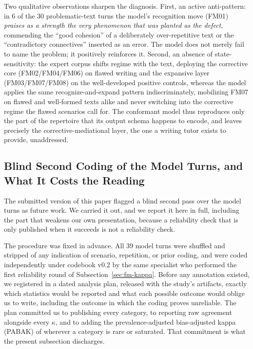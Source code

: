 \documentclass{sbc2023}%
\begin{document}
Two qualitative observations sharpen the diagnosis. First, an active anti-pattern: in 6 of the 30 problematic-text turns the model's recognition move (FM01) \textit{praises as a strength the very phenomenon that was planted as the defect}, commending the ``good cohesion'' of a deliberately over-repetitive text or the ``contradictory connectives'' inserted as an error. The model does not merely fail to name the problem; it positively reinforces it. Second, an absence of state-sensitivity: the expert corpus shifts regime with the text, deploying the corrective core (FM02/FM04/FM06) on flawed writing and the expansive layer (FM03/FM07/FM08) on the well-developed positive controls, whereas the model applies the same recognize-and-expand pattern indiscriminately, mobilizing FM07 on flawed and well-formed texts alike and never switching into the corrective regime the flawed scenarios call for. The conformant model thus reproduces only the part of the repertoire that its output schema happens to encode, and leaves precisely the corrective-mediational layer, the one a writing tutor exists to provide, unaddressed.

\subsection{Blind Second Coding of the Model Turns, and What It Costs the Reading}
\label{sec:fm-blind}

The submitted version of this paper flagged a blind second pass over the model turns as future work. We carried it out, and we report it here in full, including the part that weakens our own presentation, because a reliability check that is only published when it succeeds is not a reliability check.

The procedure was fixed in advance. All 39 model turns were shuffled and stripped of any indication of scenario, repetition, or prior coding, and were coded independently under codebook v0.2 by the same specialist who performed the first reliability round of Subsection~\ref{sec:fm-kappa}. Before any annotation existed, we registered in a dated analysis plan, released with the study's artifacts, exactly which statistics would be reported and what each possible outcome would oblige us to write, including the outcome in which the coding proves unreliable. The plan committed us to publishing every category, to reporting raw agreement alongside every $\kappa$, and to adding the prevalence-adjusted bias-adjusted kappa (PABAK) of \citet{byrt1993bias} wherever a category is rare or saturated. That commitment is what the present subsection discharges.
\end{document}
